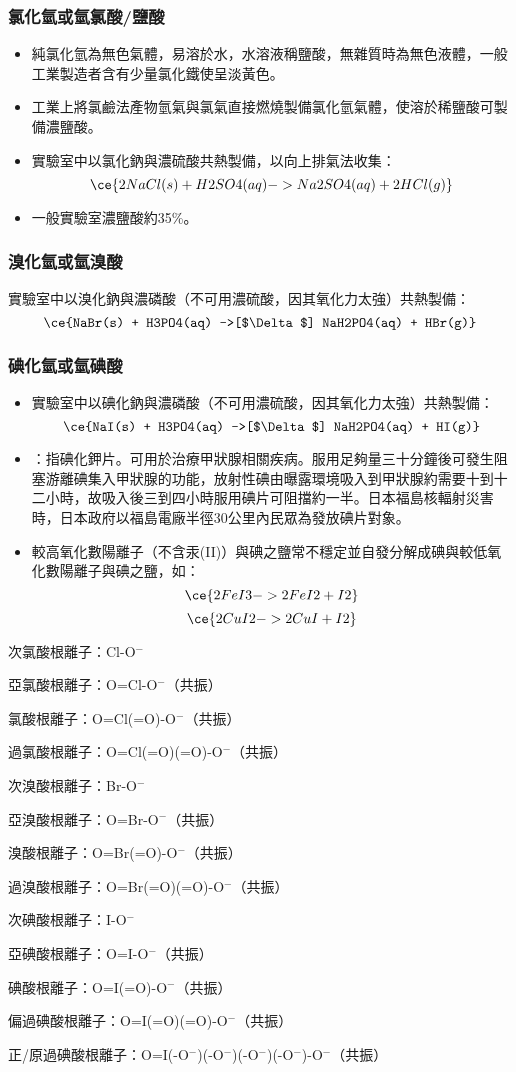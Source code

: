 \documentclass[a4paper,12pt]{report}
\begin{document}
\subsubsection{氯化氫或氫氯酸/鹽酸}
\begin{itemize}
\item 純氯化氫為無色氣體，易溶於水，水溶液稱鹽酸，無雜質時為無色液體，一般工業製造者含有少量氯化鐵使呈淡黃色。
\item 工業上將氯鹼法產物氫氣與氯氣直接燃燒製備氯化氫氣體，使溶於稀鹽酸可製備濃鹽酸。
\item 實驗室中以氯化鈉與濃硫酸共熱製備，以向上排氣法收集：
\[\ce{2NaCl(s) + H2SO4(aq) -> Na2SO4(aq) + 2HCl(g)}\]
\item 一般實驗室濃鹽酸約35\%。
\end{itemize}
\subsubsection{溴化氫或氫溴酸}
實驗室中以溴化鈉與濃磷酸（不可用濃硫酸，因其氧化力太強）共熱製備：
\[\ce{NaBr(s) + H3PO4(aq) ->[$\Delta$] NaH2PO4(aq) + HBr(g)}\]
\subsubsection{碘化氫或氫碘酸}
\begin{itemize}
\item 實驗室中以碘化鈉與濃磷酸（不可用濃硫酸，因其氧化力太強）共熱製備：
\[\ce{NaI(s) + H3PO4(aq) ->[$\Delta$] NaH2PO4(aq) + HI(g)}\]
\item {}：指碘化鉀片。可用於治療甲狀腺相關疾病。服用足夠量三十分鐘後可發生阻塞游離碘集入甲狀腺的功能，放射性碘由曝露環境吸入到甲狀腺約需要十到十二小時，故吸入後三到四小時服用碘片可阻擋約一半。日本福島核輻射災害時，日本政府以福島電廠半徑30公里內民眾為發放碘片對象。
\item 較高氧化數陽離子（不含汞(II)）與碘之鹽常不穩定並自發分解成碘與較低氧化數陽離子與碘之鹽，如：
\[\ce{2FeI3 -> 2FeI2 + I2}\]
\[\ce{2CuI2 -> 2CuI + I2}\]
\end{itemize}
\bit
\item 次氯酸根離子：Cl-O$^-$
\item 亞氯酸根離子：O=Cl-O$^-$（共振）
\item 氯酸根離子：O=Cl(=O)-O$^-$（共振）
\item 過氯酸根離子：O=Cl(=O)(=O)-O$^-$（共振）
\item 次溴酸根離子：Br-O$^-$
\item 亞溴酸根離子：O=Br-O$^-$（共振）
\item 溴酸根離子：O=Br(=O)-O$^-$（共振）
\item 過溴酸根離子：O=Br(=O)(=O)-O$^-$（共振）
\item 次碘酸根離子：I-O$^-$
\item 亞碘酸根離子：O=I-O$^-$（共振）
\item 碘酸根離子：O=I(=O)-O$^-$（共振）
\item 偏過碘酸根離子：O=I(=O)(=O)-O$^-$（共振）
\item 正/原過碘酸根離子：O=I(-O$^-$)(-O$^-$)(-O$^-$)(-O$^-$)-O$^-$（共振）
\eit
\end{document}
